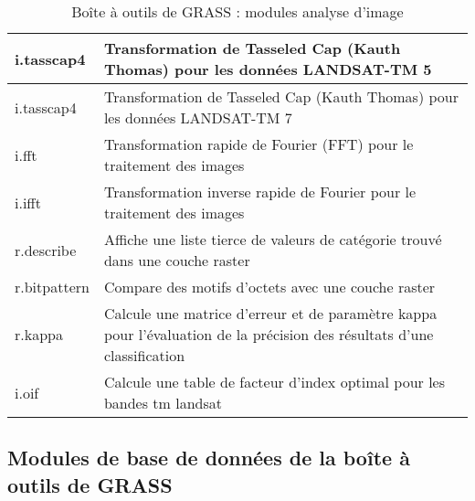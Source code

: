 \begin{table}[H]
\begin{tabular}{|p{4cm}|p{10cm}|}
  \hline i.tasscap4 & Transformation de Tasseled Cap (Kauth Thomas) pour les données LANDSAT-TM 5 \\
  \hline i.tasscap4 & Transformation de Tasseled Cap (Kauth Thomas) pour les données LANDSAT-TM 7 \\
  \hline i.fft & Transformation rapide de Fourier (FFT) pour le traitement des images \\
  \hline i.ifft & Transformation inverse rapide de Fourier pour le traitement des images \\
  \hline r.describe & Affiche une liste tierce de valeurs de catégorie trouvé dans une couche raster\\
  \hline r.bitpattern & Compare des motifs d'octets avec une couche raster\\
  \hline r.kappa & Calcule une matrice d'erreur et de paramètre kappa pour l'évaluation de la précision des résultats d'une classification \\
  \hline i.oif & Calcule une table de facteur d'index optimal pour les bandes tm landsat \\
\hline
\end{tabular}
\caption{Boîte à outils de GRASS : modules analyse d'image}
\end{table}

\subsection{Modules de base de données de la boîte à outils de GRASS}

